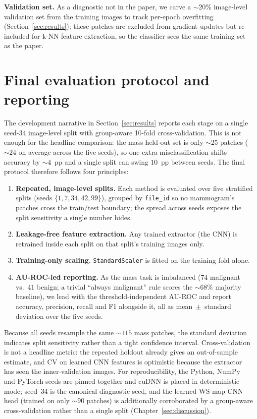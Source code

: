 \textbf{Validation set.} As a diagnostic not in the paper, we carve a $\sim$20\% image-level validation set from the training images to track per-epoch overfitting (Section~\ref{sec:results}); these patches are excluded from gradient updates but re-included for k-NN feature extraction, so the classifier sees the same training set as the paper.


\section{Final evaluation protocol and reporting} \label{sec:eval_protocol}

The development narrative in Section~\ref{sec:results} reports each stage on a single seed-34 image-level split with group-aware 10-fold cross-validation. This is not enough for the headline comparison: the mass held-out set is only ${\sim}25$ patches (${\sim}24$ on average across the five seeds), so one extra misclassification shifts accuracy by ${\sim}4$~pp and a single split can swing $10$~pp between seeds. The final protocol therefore follows four principles:
\begin{enumerate}
    \item \textbf{Repeated, image-level splits.} Each method is evaluated over five stratified splits (seeds $\{1,7,34,42,99\}$), grouped by \texttt{file\_id} so no mammogram's patches cross the train/test boundary; the spread across seeds exposes the split sensitivity a single number hides.
    \item \textbf{Leakage-free feature extraction.} Any trained extractor (the CNN) is retrained inside each split on that split's training images only.
    \item \textbf{Training-only scaling.} \texttt{StandardScaler} is fitted on the training fold alone.
    \item \textbf{AU-ROC-led reporting.} As the mass task is imbalanced ($74$ malignant vs.\ $41$ benign; a trivial ``always malignant'' rule scores the ${\sim}68\%$ majority baseline), we lead with the threshold-independent AU-ROC and report accuracy, precision, recall and F1 alongside it, all as mean~$\pm$~standard deviation over the five seeds.
\end{enumerate}

Because all seeds resample the same ${\sim}115$ mass patches, the standard deviation indicates split sensitivity rather than a tight confidence interval. Cross-validation is not a headline metric: the repeated holdout already gives an out-of-sample estimate, and CV on learned CNN features is optimistic because the extractor has seen the inner-validation images. For reproducibility, the Python, NumPy and PyTorch seeds are pinned together and cuDNN is placed in deterministic mode; seed~34 is the canonical diagnostic seed, and the learned WS-map CNN head (trained on only ${\sim}90$ patches) is additionally corroborated by a group-aware cross-validation rather than a single split (Chapter~\ref{sec:discussion}).


